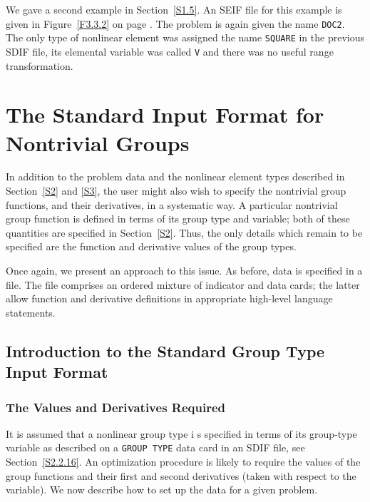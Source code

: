 \documentclass[a4paper]{article}
\begin{document}
We gave a second example in Section~\ref{S1.5}. An SEIF file for this example
is given in Figure~\ref{F3.3.2} on page \pageref{F3.3.2}.
The problem is again given the name {\tt DOC2}.
The only type of nonlinear element
was assigned  the name {\tt SQUARE}  in the previous  SDIF   file, its
elemental variable
was called  {\tt V}  and there was no  useful range
transformation.



\section[The SIF for Nontrivial Groups]{\label{S4}The Standard Input Format
for \protect\\ Nontrivial Groups}
\setcounter{figure}{0}


In  addition  to the  problem  data and  the  nonlinear  element types
described in Section~\ref{S2} and \ref{S3}, the user  might  also wish
to specify the nontrivial group functions, and their derivatives,
in  a  systematic  way.  A particular  nontrivial group   function  is
defined  in  terms  of its  group  type
and   variable;
both  of    these    quantities  are  specified  in
Section~\ref{S2}. Thus, the only details  which remain to be specified
are the function and derivative values of the group types.

Once again, we present an approach to this issue.   As before, data is
specified  in a  file.  The   file  comprises an   ordered mixture  of
indicator and  data cards;
the  latter  allow function  and derivative
definitions in appropriate high-level language statements.

\subsection[Introduction to the Standard Group Type \protect\\ Input
 Format]{\label{S4.1}Introduction to the Standard Group Type \protect\\ Input
 Format}

\subsubsection{\label{S4.1.1}The Values and Derivatives Required}

It is assumed that a nonlinear group type i
s specified in terms of its
group-type variable
as described on a {\tt GROUP TYPE}
data card in an SDIF file,  see Section~\ref{S2.2.16}. An optimization
procedure is likely to require  the  values of the group functions
and their  first  and   second  derivatives
(taken  with  respect   to the
variable).    We now  describe how  to  set up   the data for  a given
problem.
\end{document}
